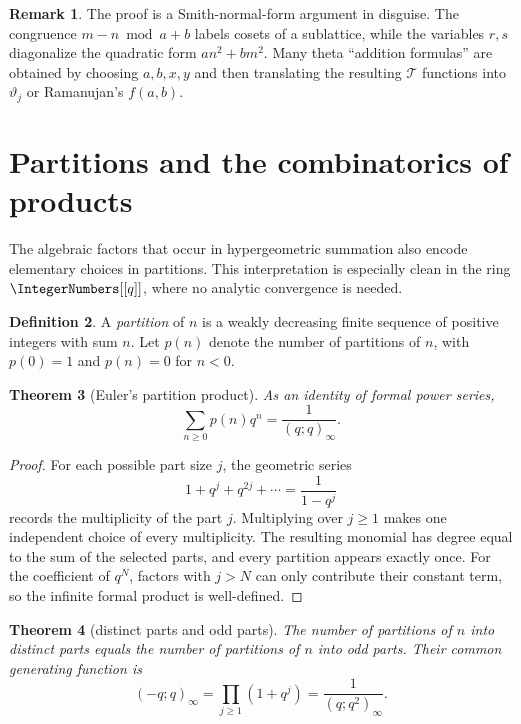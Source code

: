 \documentclass[11pt,oneside]{article}
\newtheorem{theorem}{Theorem}[section]
\theoremstyle{definition}
\newtheorem{definition}[theorem]{Definition}
\newtheorem{remark}[theorem]{Remark}
\newcommand{\T}{\mathcal T}
\begin{document}
\begin{remark}
The proof is a Smith-normal-form argument in disguise. The congruence
$m-n\bmod a+b$ labels cosets of a sublattice, while the variables
$r,s$ diagonalize the quadratic form $an^2+bm^2$. Many theta
``addition formulas'' are obtained by choosing $a,b,x,y$ and then
translating the resulting $\T$ functions into $\vartheta_j$ or
Ramanujan's $f(a,b)$.
\end{remark}


\section{Partitions and the combinatorics of products}\label{sec:partitions}

The algebraic factors that occur in hypergeometric summation also encode
elementary choices in partitions.  This interpretation is especially clean
in the ring $\IntegerNumbers[[q]]$, where no analytic convergence is needed.

\begin{definition}
A \emph{partition} of $n$ is a weakly decreasing finite sequence of positive
integers with sum $n$.  Let $p(n)$ denote the number of partitions of $n$,
with $p(0)=1$ and $p(n)=0$ for $n<0$.
\end{definition}

\begin{theorem}[Euler's partition product]\label{thm:partition-product}
As an identity of formal power series,
\begin{equation}\label{eq:partition-product}
 \sum_{n\ge0}p(n)q^n=\frac1{(q;q)_\infty}.
\end{equation}
\end{theorem}

\begin{proof}
For each possible part size $j$, the geometric series
\[
 1+q^j+q^{2j}+\cdots=\frac1{1-q^j}
\]
records the multiplicity of the part $j$.  Multiplying over $j\ge1$ makes
one independent choice of every multiplicity.  The resulting monomial has
degree equal to the sum of the selected parts, and every partition appears
exactly once.  For the coefficient of $q^N$, factors with $j>N$ can only
contribute their constant term, so the infinite formal product is
well-defined.
\end{proof}

\begin{theorem}[distinct parts and odd parts]\label{thm:distinct-odd}
The number of partitions of $n$ into distinct parts equals the number of
partitions of $n$ into odd parts.  Their common generating function is
\begin{equation}\label{eq:distinct-odd}
 (-q;q)_\infty
 =\prod_{j\ge1}(1+q^j)
 =\frac1{(q;q^2)_\infty}.
\end{equation}
\end{theorem}
\end{document}
